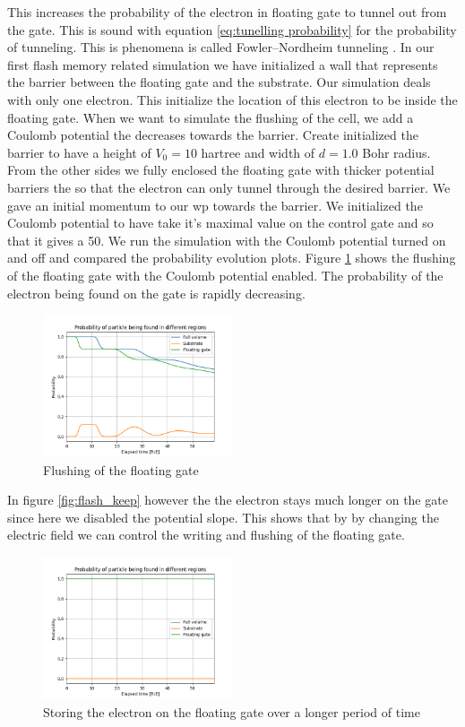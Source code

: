 This increases the probability of the electron in floating gate to tunnel out from the gate. This is sound with equation \ref{eq:tunelling probability} for the probability of tunneling.
This is phenomena is called Fowler–Nordheim tunneling \cite{Fowler_1928bv}.
In our first flash memory related simulation we have initialized a wall that represents the barrier between the floating gate and the substrate.
Our simulation deals with only one electron.
This initialize the location of this electron to be inside the floating gate.
When we want to simulate the flushing of the cell, we add a Coulomb potential the decreases towards the barrier.
Create initialized the barrier to have a height of $V_0 = 10$ hartree and width of $d = 1.0$ Bohr radius.
From the other sides we fully enclosed the floating gate with thicker potential barriers the so that the electron can only tunnel through the desired barrier.
We gave an initial momentum to our \acrshort{wp} towards the barrier.
We initialized the Coulomb potential to have take it's maximal value on the control gate and so that it gives a 50.
We run the simulation with the Coulomb potential turned on and off and compared the probability evolution plots.
Figure \ref{fig:flash_flush_plot} shows the flushing of the floating gate with the Coulomb potential enabled.
The probability of the electron being found on the gate is rapidly decreasing.
\begin{figure}
	\centering
	\includegraphics[width=0.5\textwidth]{figures/flash_flush.png}
	\caption{Flushing of the floating gate}
	\label{fig:flash_flush_plot}
\end{figure}
In figure \ref{fig:flash_keep} however the the electron stays much longer on the gate since here we disabled the potential slope.
This shows that by by changing the electric field we can control the writing and flushing of the floating gate.
\begin{figure}
	\centering
	\includegraphics[width=0.5\textwidth]{figures/flash_keep.png}
	\caption{Storing the electron on the floating gate over a longer period of time}
	\label{fig:keep_memor}
\end{figure}






